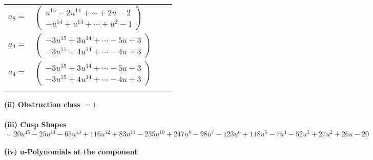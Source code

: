\documentclass[1p]{elsarticle_modified}
\theoremstyle{definition}
\begin{document}
\begin{tabular}{m{7pt} m{180pt} m{7pt} m{180pt} }
\flushright $a_{8}=$&$\begin{pmatrix}u^{15}-2 u^{14}+\cdots+2 u-2\\- u^{14}+u^{13}+\cdots+u^2-1\end{pmatrix}$ \\
\flushright $a_{4}=$&$\begin{pmatrix}-3 u^{15}+3 u^{14}+\cdots-5 u+3\\-3 u^{15}+4 u^{14}+\cdots-4 u+3\end{pmatrix}$\\ \flushright $a_{4}=$&$\begin{pmatrix}-3 u^{15}+3 u^{14}+\cdots-5 u+3\\-3 u^{15}+4 u^{14}+\cdots-4 u+3\end{pmatrix}$\\&\end{tabular}
\flushleft \textbf{(ii) Obstruction class $= 1$}\\~\\
\flushleft \textbf{(iii) Cusp Shapes $= 20 u^{15}-25 u^{14}-65 u^{13}+116 u^{12}+83 u^{11}-235 u^{10}+247 u^8-98 u^7-123 u^6+118 u^5-7 u^4-52 u^3+27 u^2+26 u-20$}\\~\\
\newpage\renewcommand{\arraystretch}{1}
\flushleft \textbf{(iv) u-Polynomials at the component}\newline \\
\end{document}
